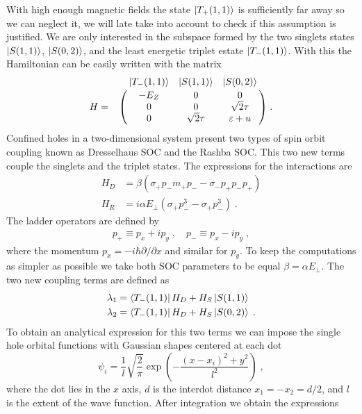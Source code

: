 \documentclass[a4paper,11pt]{article}
\begin{document}
With high enough magnetic fields the state $\ket{T_+(1,1)}$ is sufficiently far away so we can neglect it, we will late take into account to check if this assumption is justified. We are only interested in the subspace formed by the two singlets states $\ket{S(1,1)}$, $\ket{S(0,2)}$, and the least energetic triplet estate $\ket{T_-(1,1)}$. With this the Hamiltonian can be easily written with the matrix
\begin{equation}
	H=\bordermatrix{~ & \ket{T_-(1,1)} & \ket{S(1,1)} & \ket{S(0,2)}\cr
		~ & -E_Z & 0 & 0 \cr
		~ & 0 & 0 & \sqrt{2}\tau \cr
		~ & 0 & \sqrt{2}\tau & \varepsilon+u \cr}\; .
\end{equation}
Confined holes in a two-dimensional system present two types of spin orbit coupling known as Dresselhaus SOC\cite{Bulaev2005} and the Rashba SOC\cite{Winkler2002}. This two new terms couple the singlets and the triplet states. The expressions for the interactions are
\begin{equation}
	\begin{split}
	H_D&=\beta(\sigma_+p_-m_+p_--\sigma_-p_+p_-p_+)\\
	H_R&=i\alpha E_\perp (\sigma_+p_-^3-\sigma_+p_-^3)\; .
	\end{split}
\end{equation}
The ladder operators are defined by
\begin{equation}
	\begin{split}
	p_+\equiv p_x+ip_y\;, \quad p_-\equiv p_x-ip_y\;, 
	\end{split}
\end{equation}
where the momentum $p_x=-i\hbar \partial/\partial x$ and similar for $p_y$. To keep the computations as simpler as possible we take both SOC parameters to be equal $\beta=\alpha E_\perp$. The two new coupling terms are defined as
\begin{equation}
	\begin{split}
	\lambda_1&=\bra{T_-(1,1)}H_D+H_S\ket{S(1,1)}\\
	\lambda_2&=\bra{T_-(1,1)}H_D+H_S\ket{S(0,2)}\; .
	\end{split}
\end{equation}
To obtain an analytical expression for this two terms we can impose the single hole orbital functions with Gaussian shapes centered at each dot
\begin{equation}
	\psi_i=\frac{1}{l}\sqrt{\frac{2}{\pi}}\exp(-\frac{(x-x_i)^2+y^2}{l^2})\; ,
\end{equation} 
where the dot lies in the $x$ axis, $d$ is the interdot distance $x_1=-x_2=d/2$, and $l$ is the extent of the wave function. After integration we obtain the expressions
\end{document}
